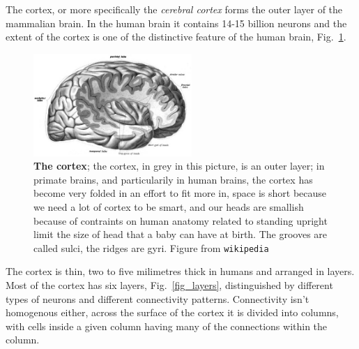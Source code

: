 \documentclass[12pt]{article}
\begin{document}
The cortex, or more specifically the \textsl{cerebral cortex} forms
the outer layer of the mammalian brain. In the human brain it contains
14-15 billion neurons and the extent of the cortex is one of the
distinctive feature of the human brain, Fig.~\ref{fig_cortex}. 

\begin{figure}[tbhp]
  \begin{center}
  \includegraphics[width=6cm]{cortex.png}
\end{center}
  \caption{\textbf{The cortex}; the cortex, in grey in this picture,
    is an outer layer; in primate brains, and particularily in human
    brains, the cortex has become very folded in an effort to fit more
    in, space is short because we need a lot of cortex to be smart,
    and our heads are smallish because of contraints on human anatomy
    related to standing upright limit the size of head that a baby can
    have at birth. The grooves are called sulci, the ridges are gyri. Figure from \texttt{wikipedia}\label{fig_cortex}}
\end{figure}

The cortex is thin, two to five milimetres thick in humans and
arranged in layers. Most of the cortex has six layers, Fig.~\ref{fig_layers}, distinguished by
different types of neurons and different connectivity
patterns. Connectivity isn't homogenous either, across the surface of
the cortex it is divided into columns, with cells inside a given column having many of the connections within the column.
\end{document}

